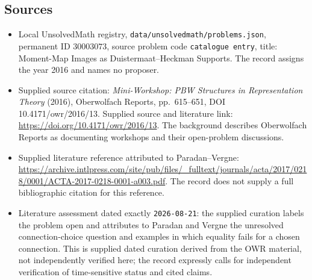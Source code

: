 \documentclass[11pt]{article}
\begin{document}
\subsection{Sources}
\begin{itemize}
\item Local UnsolvedMath registry, \texttt{data/unsolvedmath/problems.json}, permanent ID \(30003073\), source problem code \texttt{catalogue entry}, title: Moment-Map Images as Duistermaat--Heckman Supports. The record assigns the year 2016 and names no proposer.
\item Supplied source citation: \emph{Mini-Workshop: PBW Structures in Representation Theory} (2016), Oberwolfach Reports, pp.~615--651, DOI 10.4171/owr/2016/13. Supplied source and literature link: \url{https://doi.org/10.4171/owr/2016/13}. The background describes Oberwolfach Reports as documenting workshops and their open-problem discussions.
\item Supplied literature reference attributed to Paradan--Vergne: \url{https://archive.intlpress.com/site/pub/files/_fulltext/journals/acta/2017/0218/0001/ACTA-2017-0218-0001-a003.pdf}. The record does not supply a full bibliographic citation for this reference.
\item Literature assessment dated exactly \texttt{2026-08-21}: the supplied curation labels the problem open and attributes to Paradan and Vergne the unresolved connection-choice question and examples in which equality fails for a chosen connection. This is supplied dated curation derived from the OWR material, not independently verified here; the record expressly calls for independent verification of time-sensitive status and cited claims.
\end{itemize}
\end{document}
